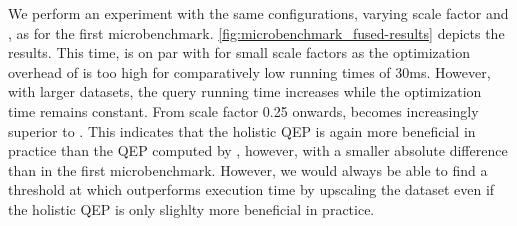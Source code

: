 We perform an experiment with the same configurations, \ie varying scale factor and , as for the first microbenchmark.  \autoref{fig:microbenchmark_fused-results} depicts the results.  This time, \split is on par with \holistic for small scale factors as the optimization overhead of \holistic is too high for comparatively low running times of 30ms.  However, with larger datasets, the query running time increases while the optimization time remains constant.  From scale factor 0.25 onwards, \holistic becomes increasingly superior to \split.  This indicates that the holistic QEP is again more beneficial in practice than the QEP computed by \split, however, with a smaller absolute difference than in the first microbenchmark.  However, we would always be able to find a threshold at which \holistic outperforms \split \wrt {} execution time by upscaling the dataset even if the holistic QEP is only slighlty more beneficial in practice.

